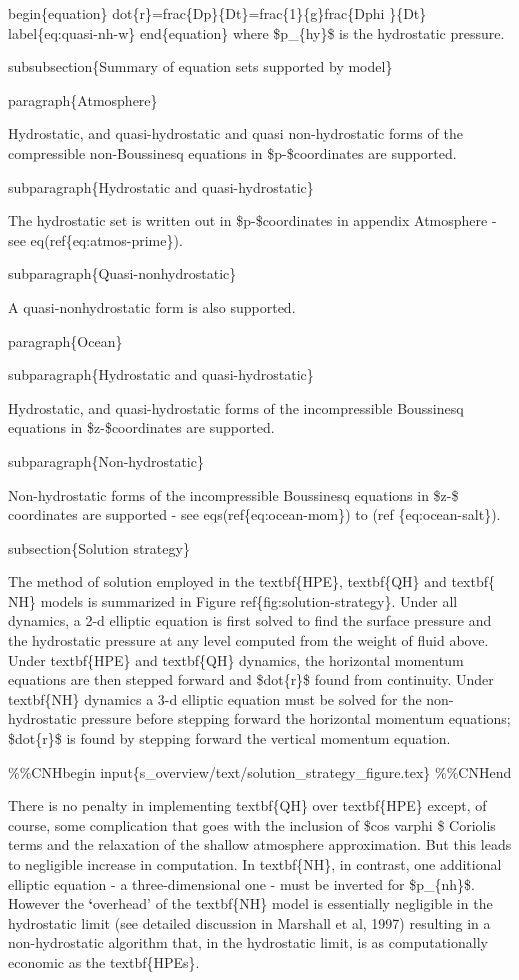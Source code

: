 \documentclass[letterpaper,10pt,english]{sphinxmanual}
\begin{document}
begin\{equation\}
dot\{r\}=frac\{Dp\}\{Dt\}=frac\{1\}\{g\}frac\{Dphi \}\{Dt\}  label\{eq:quasi-nh-w\}
end\{equation\}
where \$p\_\{hy\}\$ is the hydrostatic pressure.

subsubsection\{Summary of equation sets supported by model\}

paragraph\{Atmosphere\}

Hydrostatic, and quasi-hydrostatic and quasi non-hydrostatic forms of the
compressible non-Boussinesq equations in \$p-\$coordinates are supported.

subparagraph\{Hydrostatic and quasi-hydrostatic\}

The hydrostatic set is written out in \$p-\$coordinates in appendix Atmosphere
- see eq(ref\{eq:atmos-prime\}).

subparagraph\{Quasi-nonhydrostatic\}

A quasi-nonhydrostatic form is also supported.

paragraph\{Ocean\}

subparagraph\{Hydrostatic and quasi-hydrostatic\}

Hydrostatic, and quasi-hydrostatic forms of the incompressible Boussinesq
equations in \$z-\$coordinates are supported.

subparagraph\{Non-hydrostatic\}

Non-hydrostatic forms of the incompressible Boussinesq equations in \$z-\$
coordinates are supported - see eqs(ref\{eq:ocean-mom\}) to (ref
\{eq:ocean-salt\}).

subsection\{Solution strategy\}

The method of solution employed in the textbf\{HPE\}, textbf\{QH\} and textbf\{
NH\} models is summarized in Figure ref\{fig:solution-strategy\}.
Under all dynamics, a 2-d elliptic equation is
first solved to find the surface pressure and the hydrostatic pressure at
any level computed from the weight of fluid above. Under textbf\{HPE\} and
textbf\{QH\} dynamics, the horizontal momentum equations are then stepped
forward and \$dot\{r\}\$ found from continuity. Under textbf\{NH\} dynamics a
3-d elliptic equation must be solved for the non-hydrostatic pressure before
stepping forward the horizontal momentum equations; \$dot\{r\}\$ is found by
stepping forward the vertical momentum equation.

\%\%CNHbegin
input\{s\_overview/text/solution\_strategy\_figure.tex\}
\%\%CNHend

There is no penalty in implementing textbf\{QH\} over textbf\{HPE\} except, of
course, some complication that goes with the inclusion of \$cos varphi \$
Coriolis terms and the relaxation of the shallow atmosphere approximation.
But this leads to negligible increase in computation. In textbf\{NH\}, in
contrast, one additional elliptic equation - a three-dimensional one - must
be inverted for \$p\_\{nh\}\$. However the {\color{red}\bfseries{}{}`}overhead' of the textbf\{NH\} model is
essentially negligible in the hydrostatic limit (see detailed discussion in
Marshall et al, 1997) resulting in a non-hydrostatic algorithm that, in the
hydrostatic limit, is as computationally economic as the textbf\{HPEs\}.
\end{document}
